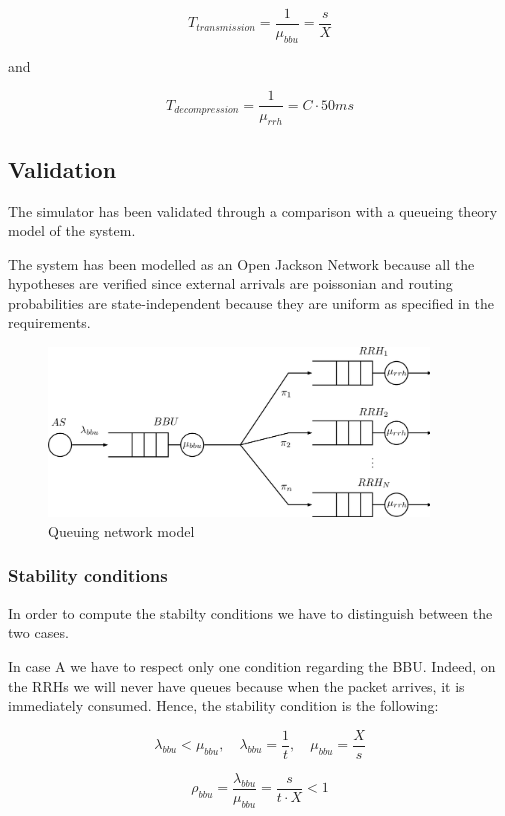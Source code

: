 \documentclass[11pt,a4paper,oneside, openright]{article}
\begin{document}
$$ T_{transmission} = \frac{1}{\mu_{bbu}} = \frac{s}{X} $$

and

$$ T_{decompression} = \frac{1}{\mu_{rrh}} = C \cdot 50ms $$

\subsection{Validation}
The simulator has been validated through a comparison with a queueing theory model of the system.

The system has been modelled as an Open Jackson Network because all the hypotheses are verified since external arrivals are poissonian and routing probabilities are state-independent because they are uniform as specified in the requirements.

\begin{figure}[h]
    \centering
    \includegraphics[width=0.9\textwidth]{images/model}
    \caption{Queuing network model}
    \label{fig:model}
\end{figure}

\subsubsection{Stability conditions}
In order to compute the stabilty conditions we have to distinguish between the two cases.

In case A we have to respect only one condition regarding the BBU. Indeed, on the RRHs we will never have queues because when the packet arrives, it is immediately consumed.
Hence, the stability condition is the following:

$$ \lambda_{bbu} < \mu_{bbu}, \quad \lambda_{bbu} = \frac{1}{t}, \quad \mu_{bbu} = \frac{X}{s}$$

\begin{equation} \label{eq:rho-bbu}
\rho_{bbu} = \frac{\lambda_{bbu}}{\mu_{bbu}} = \frac{s}{t \cdot X} < 1
\end{equation}
\end{document}
